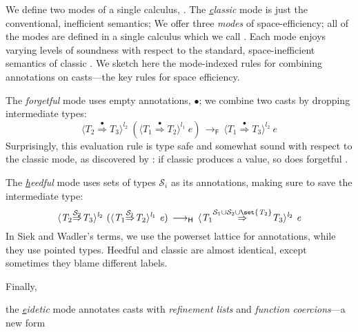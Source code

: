 \documentclass[9pt]{extarticle}
\newcommand{\ottnt}[1]{\mathit{#1}}
\newcommand{\ottmv}[1]{\mathit{#1}}
\begin{document}
{\ifpopl
We define two modes of a single calculus, \lambdah. The \textit{\underline{c}lassic} mode is just the conventional, inefficient semantics; 
\else
We offer three \textit{modes} of space-efficiency; all of the modes
are defined in a single calculus which we call \lambdah. Each mode
enjoys varying levels of soundness with respect to the standard,
space-inefficient semantics of classic \lambdah.
We sketch here the mode-indexed rules for combining annotations on
casts---the key rules for space efficiency.

The \textit{\underline{f}orgetful} mode uses empty annotations, $ \bullet $; we combine two
casts by dropping intermediate types:
\[  \langle  \ottnt{T_{{\mathrm{2}}}}  \mathord{ \overset{ \bullet }{\Rightarrow} }  \ottnt{T_{{\mathrm{3}}}}  \rangle^{ \ottnt{l_{{\mathrm{2}}}} } ~   (  \langle  \ottnt{T_{{\mathrm{1}}}}  \mathord{ \overset{ \bullet }{\Rightarrow} }  \ottnt{T_{{\mathrm{2}}}}  \rangle^{ \ottnt{l_{{\mathrm{1}}}} } ~  \ottnt{e}  )   \,  \longrightarrow _{  \mathsf{F}  }  \,  \langle  \ottnt{T_{{\mathrm{1}}}}  \mathord{ \overset{ \bullet }{\Rightarrow} }  \ottnt{T_{{\mathrm{3}}}}  \rangle^{ \ottnt{l_{{\mathrm{2}}}} } ~  \ottnt{e}  \]
Surprisingly, this evaluation rule is type safe and somewhat sound
with respect to the classic mode, as discovered by
\citet{Greenberg13thesis}: if classic \lambdah produces a value, so
does forgetful \lambdah.

The \textit{\underline{h}eedful} mode uses sets of types $\mathcal{S}_{\ottmv{i}}$ as its
annotations, making sure to save the intermediate type:
\[  \langle  \ottnt{T_{{\mathrm{2}}}}  \mathord{ \overset{ \mathcal{S}_{{\mathrm{2}}} }{\Rightarrow} }  \ottnt{T_{{\mathrm{3}}}}  \rangle^{ \ottnt{l_{{\mathrm{2}}}} } ~   (  \langle  \ottnt{T_{{\mathrm{1}}}}  \mathord{ \overset{ \mathcal{S}_{{\mathrm{1}}} }{\Rightarrow} }  \ottnt{T_{{\mathrm{2}}}}  \rangle^{ \ottnt{l_{{\mathrm{1}}}} } ~  \ottnt{e}  )   \,  \longrightarrow _{  \mathsf{H}  }  \,  \langle  \ottnt{T_{{\mathrm{1}}}}  \mathord{ \overset{   \mathcal{S}_{{\mathrm{1}}}  \cup  \mathcal{S}_{{\mathrm{2}}}   \cup   \set{  \ottnt{T_{{\mathrm{2}}}}  }   }{\Rightarrow} }  \ottnt{T_{{\mathrm{3}}}}  \rangle^{ \ottnt{l_{{\mathrm{2}}}} } ~  \ottnt{e}  \]
In Siek and Wadler's terms, we use the powerset lattice for
annotations, while they use pointed types.
Heedful and classic \lambdah are almost identical, except sometimes
they blame different labels. 

Finally,\fi} the \textit{\underline{e}idetic} mode annotates casts with
\textit{refinement lists} and \textit{function coercions}---a new form
\end{document}
